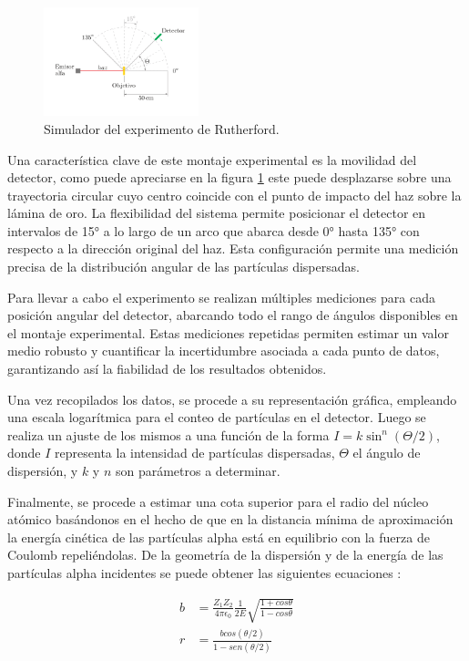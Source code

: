 \documentclass[twocolumn,a4paper,11pt]{scrartcl}
\begin{document}
\begin{figure}[h!]
    \centering
    \includegraphics[width=0.4\textwidth]{simulador.png}
    \caption{Simulador del experimento de Rutherford.}
    \label{fig:simulador}
\end{figure}

Una característica clave de este montaje experimental es la movilidad del detector, como puede apreciarse en la figura \ref{fig:simulador} este puede desplazarse sobre una trayectoria circular cuyo centro coincide con el punto de impacto del haz sobre la lámina de oro. La flexibilidad del sistema permite posicionar el detector en intervalos de 15° a lo largo de un arco que abarca desde 0° hasta 135° con respecto a la dirección original del haz. Esta configuración permite una medición precisa de la distribución angular de las partículas dispersadas.

Para llevar a cabo el experimento se realizan múltiples mediciones para cada posición angular del detector, abarcando todo el rango de ángulos disponibles en el montaje experimental. Estas mediciones repetidas permiten estimar un valor medio robusto y cuantificar la incertidumbre asociada a cada punto de datos, garantizando así la fiabilidad de los resultados obtenidos.

Una vez recopilados los datos, se procede a su representación gráfica, empleando una escala logarítmica para el conteo de partículas en el detector. Luego se realiza un ajuste de los mismos a una función de la forma $I = k \sin^n (\Theta/2)$, donde $I$ representa la intensidad de partículas dispersadas, $\Theta$ el ángulo de dispersión, y $k$ y $n$ son parámetros a determinar. 

Finalmente, se procede a estimar una cota superior para el radio del núcleo atómico basándonos en el hecho de que en la distancia mínima de aproximación la energía cinética de las partículas alpha está en equilibrio con la fuerza de Coulomb repeliéndolas. De la geometría de la dispersión y de la energía de las partículas alpha incidentes se puede obtener las siguientes ecuaciones  \cite{Symon1960}:

\begin{equation}
  \begin{aligned}
    b &= \frac{Z_1Z_2}{4\pi \epsilon_0} \frac{1}{2E} \sqrt{\frac{1 + cos\theta}{1-cos\theta}} \\
    r &= \frac{b cos(\theta /2)}{1-sen(\theta /2)}
  \end{aligned}
  \label{eq:radio_nuclear}
\end{equation}
\end{document}
